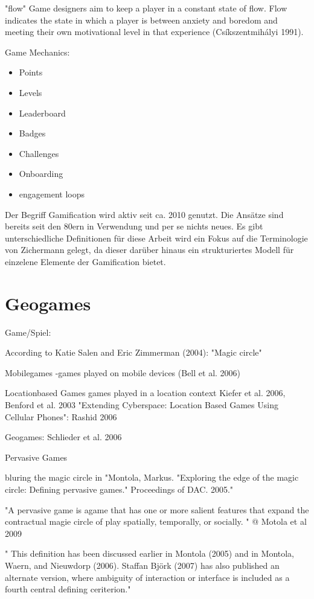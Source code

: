 "flow"
Game designers aim to
keep a player in a constant state of flow. Flow indicates the state in which a player is between
anxiety and boredom and meeting their own motivational level in that experience
(Csíkszentmihályi 1991).

Game Mechanics:
\begin{itemize}
      \item Points
      \item Levels
      \item Leaderboard
      \item Badges
      \item Challenges
      \item Onboarding
      \item engagement loops
\end{itemize}

Der Begriff Gamification wird aktiv seit ca. 2010 genutzt. Die Ansätze sind bereits seit den 80ern in Verwendung und per se nichts neues.
Es gibt unterschiedliche Definitionen für diese Arbeit wird ein Fokus auf die Terminologie von Zichermann gelegt, da dieser darüber hinaus ein strukturiertes Modell für einzelene Elemente der Gamification bietet.

\section{Geogames}
\label{subsec:S3_Geogames}

Game/Spiel:

According to  Katie  Salen  and  Eric  Zimmerman  (2004): "Magic circle"

Mobilegames
-games played on mobile devices (Bell et al. 2006)

Locationbased Games
games played in a location context
Kiefer et al. 2006, Benford et al. 2003
"Extending Cyberspace: Location Based Games Using Cellular Phones":
Rashid 2006

Geogames:
Schlieder et al. 2006

Pervasive Games

bluring the magic circle in "Montola, Markus. "Exploring the edge of the magic circle: Defining pervasive games." Proceedings of DAC. 2005."

"A pervasive game is agame that has one or more salient features that expand the 
contractual magie circle of play spatially, temporally, or socially. " @ Motola et al 2009

" This   definition   has   been   discussed   earlier  in   Montola   (2005)   and   in   Montola,   Waern,   and 
Nieuwdorp  (2006).  Staffan  Björk  (2007)  has  also  published  an  alternate version,  where  ambiguity 
of  interaction or  interface is  included  as  a  fourth  central  defining ceriterion." 

